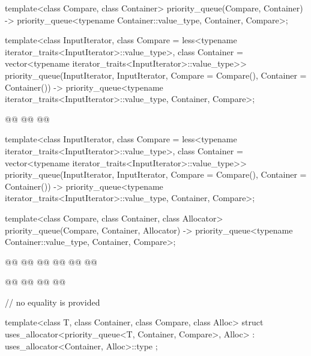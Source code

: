 \documentclass{wg21}
\begin{document}
\begin{codeblock}
{template<class Compare, class Container>
priority_queue(Compare, Container)
-> priority_queue<typename Container::value_type, Container, Compare>;

template<class InputIterator,
class Compare = less<typename iterator_traits<InputIterator>::value_type>,
class Container = vector<typename iterator_traits<InputIterator>::value_type>>
priority_queue(InputIterator, InputIterator, Compare = Compare(), Container = Container())
-> priority_queue<typename iterator_traits<InputIterator>::value_type, Container, Compare>;

@@
@@
@@

template<class InputIterator,
class Compare = less<typename iterator_traits<InputIterator>::value_type>,
class Container = vector<typename iterator_traits<InputIterator>::value_type>>
priority_queue(InputIterator, InputIterator, Compare = Compare(), Container = Container())
-> priority_queue<typename iterator_traits<InputIterator>::value_type, Container, Compare>;


template<class Compare, class Container, class Allocator>
priority_queue(Compare, Container, Allocator)
-> priority_queue<typename Container::value_type, Container, Compare>;

@@
@@
@@
@@
@@
@@

@@
@@
@@
@@

// no equality is provided

template<class T, class Container, class Compare, class Alloc>
struct uses_allocator<priority_queue<T, Container, Compare>, Alloc>
: uses_allocator<Container, Alloc>::type { };
}
\end{codeblock}
\end{document}
